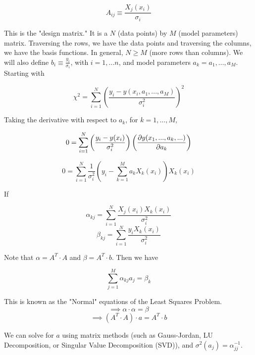 \documentclass[]{article}
\begin{document}
\[A_{ij} \equiv \frac{X_j(x_i)}{\sigma_i}\]

This is the "design matrix." It is a $N$ (data points) by $M$ (model parameters) matrix. Traversing the rows, we have the data points and traversing the columns, we have the basis functions. In general, $N\geq M$ (more rows than columns). We will also define $b_i \equiv \frac{y_i}{\sigma_i}$, with $i = 1, ... n$, and model parameters $a_k = a_1, ..., a_M$. \\

Starting with 

\[\chi^2 = \sum_{i=1}^N \left(\frac{y_i - y(x_i, a_1, ..., a_M)}{\sigma_i^2}\right)^2\]

Taking the derivative with respect to $a_k$, for $k = 1, ... , M$,

\[0 = \sum_{i=1}^N \left( \frac{y_i - y(x_i)}{\sigma_i^2}\right)\left( \pdv{y(x_1, ..., a_k, ...)}{a_k}\right) \]

\[0 = \sum_{i=1}^N \frac{1}{\sigma_i^2}\left( y_i - \sum_{k=1}^M a_k X_k(x_i)\right)X_k(x_i) \]

If 

\[\alpha_{kj} = \sum_{i=1}^N \frac{X_j(x_i)X_k(x_i)}{\sigma_i^2}\]
\[\beta_{kj} = \sum_{i=1}^N \frac{y_iX_k(x_i)}{\sigma_i^2}\]

Note that $\alpha = A^T\cdot A$ and  $\beta = A^T\cdot b$. Then we have 

\[\sum_{j=1}^M \alpha_{kj}a_j = \beta_k \]

This is known as the "Normal" equations of the Least Squares Problem.\\

\[\implies \alpha \cdot \alpha = \beta\]
\[\implies (A^T\cdot A)\cdot a = A^T \cdot b\]

We can solve for $a$ using matrix methods (such as Gauss-Jordan, LU Decomposition, or Singular Value Decomposition (SVD)), and $\sigma^2(a_j) = \alpha_{jj}^{-1}$.\\
\end{document}
